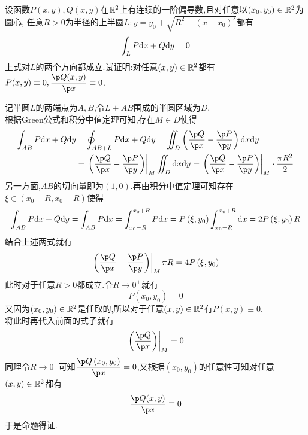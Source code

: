 \documentclass{ctexart}
\begin{document}
\begin{problem}[8.(6\songti{分})]
    设函数$P(x,y),Q(x,y)$在$\mathbb{R}^2$上有连续的一阶偏导数,且对任意以$\left(x_0,y_0\right)\in\mathbb{R}^2$为圆心,%
    任意$R>0$为半径的上半圆$L:y=y_0+\sqrt{R^2-\left(x-x_0\right)^2}$都有
    \[\int_LP\mathrm{d} x+Q\mathrm{d} y=0\]
    上式对$L$的两个方向都成立.试证明:对任意$(x,y)\in\mathbb{R}^2$都有$P(x,y)\equiv0,\dfrac{\p Q(x,y)}{\p x}\equiv0$.
\end{problem}
\begin{solution}
    记半圆$L$的两端点为$A,B$,令$L+AB$围成的半圆区域为$D$.\\
    根据Green公式和积分中值定理可知,存在$M\in D$使得
    \[\begin{aligned}
        \int_{AB}P\dx+Q\di y
        &= \oint_{AB+L}P\dx+Q\di y = \iint_{D}\left(\dfrac{\p Q}{\p x}-\dfrac{\p P}{\p y}\right)\di x\di y \\
        &= \left.\left(\dfrac{\p Q}{\p x}-\dfrac{\p P}{\p y}\right)\right|_{M}\iint_{D}\di x\di y=\left.\left(\dfrac{\p Q}{\p x}-\dfrac{\p P}{\p y}\right)\right|_{M}\cdot\dfrac{\pi R^2}{2}
    \end{aligned}\]
    另一方面,$AB$的切向量即为$(1,0)$.再由积分中值定理可知存在$\xi\in\left(x_0-R,x_0+R\right)$使得
    \[\int_{AB}P\mathrm{d} x+Q\mathrm{d} y
    = \int_{AB}P\mathrm{d} x
    = \int_{x_0-R}^{x_0+R}P\mathrm{d} x
    = P\left(\xi,y_0\right)\int_{x_0-R}^{x_0+R}\mathrm{d} x
    = 2P\left(\xi,y_0\right)R\]
    结合上述两式就有
    \[\left.\left(\dfrac{\p Q}{\p x}-\dfrac{\p P}{\p y}\right)\right|_{M}\pi R=4P\left(\xi,y_0\right)\]
    此时对于任意$R>0$都成立.令$R\to0^+$就有
    \[P\left(x_0,y_0\right)=0\]
    又因为$\left(x_0,y_0\right)\in\mathbb{R}^2$是任取的,所以对于任意$(x,y)\in\mathbb{R}^2$有$P(x,y)\equiv0$.\\
    将此时再代入前面的式子就有
    \[\left.\left(\dfrac{\p Q}{\p x}\right)\right|_{M}=0\]
    同理令$R\to0^+$可知$\dfrac{\p Q\left(x_0,y_0\right)}{\p x}=0$,又根据$\left(x_0,y_0\right)$的任意性可知对任意$(x,y)\in\mathbb{R}^2$都有
    \[\dfrac{\p Q(x,y)}{\p x}\equiv0\]
    于是命题得证.

\end{solution}
\end{document}
